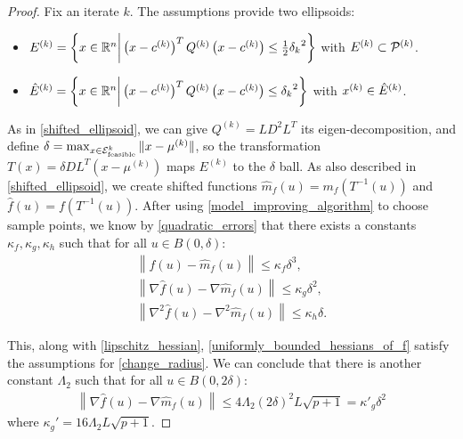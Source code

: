 \begin{proof}
Fix an iterate $k$.
The assumptions provide two ellipsoids:
\begin{itemize}
\item ${E^{(k)}} = \left\{x \in \mathbb R^n \bigg | \left(x - c^{(k)} \right)^T {Q^{(k)}} \left(x - c^{(k)}\right) \le \frac 1 2 {\delta_k}^2 \right\}$ with ${E^{(k)}} \subset {{\mathcal{P}}^{(k)}}$.
\item ${{\hat E}^{(k)}} = \left\{x \in \mathbb R^n \bigg | \left(x - c^{(k)}\right)^T {Q^{(k)}} \left(x - c^{(k)}\right) \le {\delta_k}^2 \right\}$ with $x^{(k)} \in {{\hat E}^{(k)}}$.
\end{itemize}
As in \cref{shifted_ellipsoid}, we can give $Q^{(k)} = LD^2L^T$ its eigen-decomposition, and define $\delta = \max_{x \in {\mathcal E^k_{\textrm{feasible}}}} \|x - \mu^{(k)}\|$, 
so the transformation $T(x) = \delta D L^T(x - \mu^{(k)})$ maps $E^{(k)}$ to the $\delta$ ball.
As also described in \cref{shifted_ellipsoid}, we  create shifted functions
$\hat {m}_f(u) = m_f(T^{-1}(u))$ and
$\hat f (u) = f(T^{-1}(u))$.
After using \cref{model_improving_algorithm} to choose sample points, we know by \cref{quadratic_errors} that there exists a constants $\kappa_f, \kappa_g, \kappa_h$ such that for all $u \in B(0, \delta)$:
\begin{align*}
\left\| \hat {f}\left(u\right) -  \hat{m}_f\left(u\right) \right\|\le \kappa_f \delta^3, \\
\left\|\nabla \hat {f}\left(u\right) - \nabla \hat{m}_f\left(u\right) \right\|\le \kappa_g \delta^2, \\
\left\|\nabla^2 \hat {f}\left(u\right) - \nabla^2 \hat{m}_f\left(u\right) \right\|\le \kappa_h \delta.
\end{align*}

This, along with \cref{lipschitz_hessian}, \cref{uniformly_bounded_hessians_of_f} satisfy the assumptions for \cref{change_radius}.
We can conclude that there is another constant $\Lambda_2$ such that for all $u \in B(0, 2\delta)$:
\begin{align*}
\left\|\nabla \hat {f}\left(u\right) - \nabla \hat{m}_f\left(u\right) \right\|\le 4 \Lambda_2 \left(2\delta\right)^2 L \sqrt{p+1} = {\kappa'}_g\delta^2
\end{align*}
where $\kappa_{g}' = 16 \Lambda_2 L \sqrt{p+1}$.


\end{proof}
